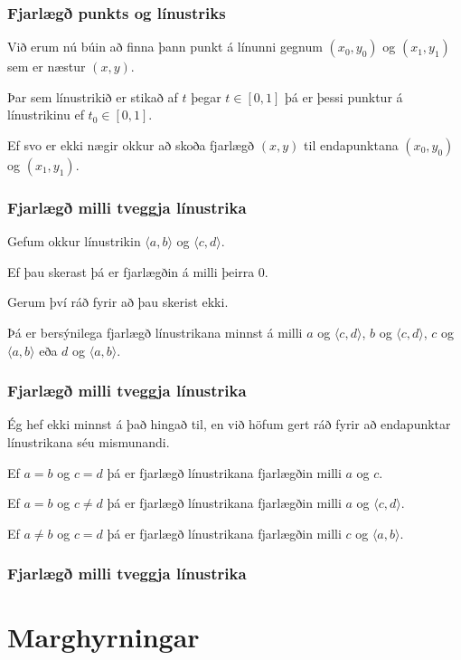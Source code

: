 {
	\frametitle{Fjarlægð punkts og línustriks}
	{
		\item<1-> Við erum nú búin að finna þann punkt á línunni gegnum $(x_0, y_0)$ og $(x_1, y_1)$ sem er
			næstur $(x, y)$. 
		\item<2-> Þar sem línustrikið er stikað af $t$ þegar $t \in [0, 1]$ þá er þessi punktur
			á línustrikinu ef $t_0 \in [0, 1]$.
		\item<3-> Ef svo er ekki nægir okkur að skoða fjarlægð $(x, y)$ til endapunktana $(x_0, y_0)$ og $(x_1, y_1)$.
		\item<4->[] 
	}
}

{
	\frametitle{Fjarlægð milli tveggja línustrika}
	{
		\item<1-> Gefum okkur línustrikin $\langle a, b \rangle$ og $\langle c, d \rangle$.
		\item<2-> Ef þau skerast þá er fjarlægðin á milli þeirra $0$.
		\item<3-> Gerum því ráð fyrir að þau skerist ekki.
		\item<4-> Þá er bersýnilega fjarlægð línustrikana minnst á milli 
			$a$ og $\langle c, d \rangle$, 
			$b$ og $\langle c, d \rangle$, 
			$c$ og $\langle a, b \rangle$ eða 
			$d$ og $\langle a, b \rangle$.
	}
}

{
	\frametitle{Fjarlægð milli tveggja línustrika}
	{
		\item<1-> Ég hef ekki minnst á það hingað til, en við höfum gert ráð fyrir að endapunktar 
			línustrikana séu mismunandi.
		\item<2-> Ef $a = b$ og $c = d$ þá er fjarlægð línustrikana fjarlægðin milli $a$ og $c$.
		\item<3-> Ef $a = b$ og $c \neq d$ þá er fjarlægð línustrikana fjarlægðin milli $a$ og $\langle c, d \rangle$.
		\item<4-> Ef $a \neq b$ og $c = d$ þá er fjarlægð línustrikana fjarlægðin milli $c$ og $\langle a, b \rangle$.
	}
}

{
	\frametitle{Fjarlægð milli tveggja línustrika}
}

\section{Marghyrningar}

